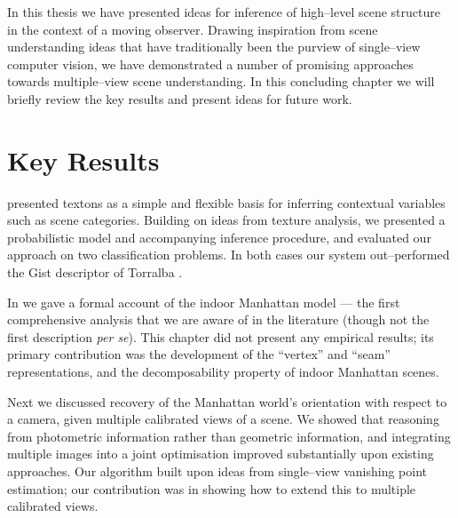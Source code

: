 


In this thesis we have presented ideas for inference of high--level
scene structure in the context of a moving observer. Drawing inspiration
from scene understanding ideas that have traditionally been the
purview of single--view computer vision, we have demonstrated a number
of promising approaches towards multiple--view scene understanding. In
this concluding chapter we will briefly review the key results and
present ideas for future work.

\section{Key Results}

 presented textons as a simple and flexible
basis for inferring contextual variables such as scene
categories. Building on ideas from texture analysis, we presented a
probabilistic model and accompanying inference procedure, and
evaluated our approach on two classification problems. In both cases
our system out--performed the Gist descriptor of Torralba \etal.

In  we gave a formal account of the indoor Manhattan
model --- the first comprehensive analysis that we are aware of in the
literature (though not the first description \textit{per se}). This
chapter did not present any empirical results; its primary
contribution was the development of the ``vertex'' and ``seam''
representations, and the
decomposability property of indoor Manhattan scenes.

Next we discussed recovery of the Manhattan world's orientation with
respect to a camera, given multiple calibrated views of a scene. We
showed that reasoning from photometric information rather than
geometric information, and integrating multiple images into a joint
optimisation improved substantially upon existing approaches. Our
algorithm built upon ideas from single--view vanishing point
estimation; our contribution was in showing how to extend this to
multiple calibrated views.

